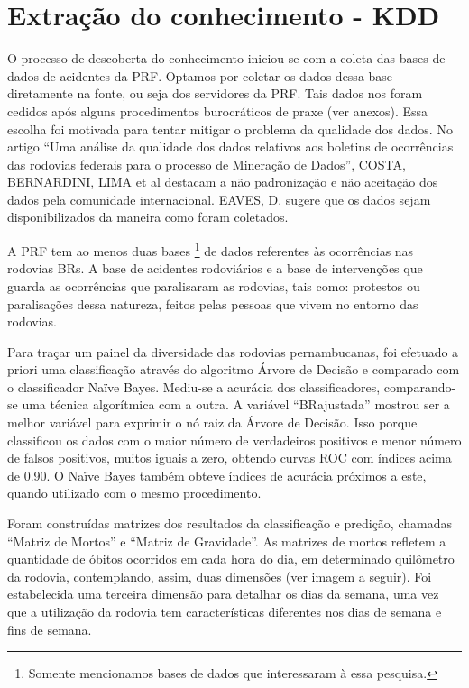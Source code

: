 \section{Extração do conhecimento - KDD}

O processo de descoberta do conhecimento iniciou-se com a coleta das bases de dados de acidentes da PRF. Optamos por coletar os dados dessa base diretamente na fonte,
ou seja dos servidores da PRF. Tais dados nos foram cedidos após alguns procedimentos burocráticos de praxe (ver anexos). Essa escolha foi motivada para tentar
mitigar o problema da qualidade dos dados. No artigo ``Uma análise da qualidade dos dados relativos aos boletins de ocorrências das rodovias federais para o processo de Mineração de Dados'', COSTA, BERNARDINI, LIMA et al \cite{Costa2015} destacam a não padronização e não aceitação dos dados pela comunidade internacional. EAVES, D. \cite{Eaves} sugere que os dados sejam disponibilizados da maneira como foram coletados.

A PRF tem ao menos duas bases \footnote{Somente mencionamos bases de dados que interessaram à essa pesquisa.} de dados referentes às ocorrências nas rodovias BRs. A base de acidentes rodoviários e a base de intervenções que guarda as ocorrências que paralisaram as rodovias, tais como: protestos ou paralisações dessa natureza, feitos pelas pessoas que vivem no entorno das rodovias.

Para traçar um painel da diversidade das rodovias pernambucanas, foi efetuado a priori uma classificação através do algoritmo Árvore de Decisão e comparado com o classificador Naïve Bayes. Mediu-se a acurácia dos classificadores, comparando-se uma técnica algorítmica com a outra. A variável ``BRajustada'' mostrou ser a melhor variável para exprimir o nó raiz da Árvore de Decisão. Isso porque classificou os dados com o maior número de verdadeiros positivos e menor número de falsos positivos, muitos iguais a zero, obtendo curvas ROC com índices acima de 0.90. O Naïve Bayes também obteve índices de acurácia próximos a este, quando utilizado com o mesmo procedimento.

Foram construídas matrizes dos resultados da classificação e predição, chamadas ``Matriz de Mortos'' e ``Matriz de Gravidade''. As matrizes de mortos refletem a quantidade de óbitos ocorridos em cada hora do dia, em determinado quilômetro da rodovia, contemplando, assim, duas dimensões (ver imagem a seguir). Foi estabelecida uma terceira dimensão para detalhar os dias da semana, uma vez que a utilização da rodovia tem características diferentes nos dias de semana e fins de semana. 

